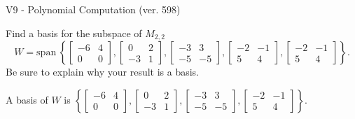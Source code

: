 \begin{exercise}
  \begin{exerciseTitle}V9 - Polynomial Computation (ver. 598)\end{exerciseTitle}
  \begin{exerciseStatement}
    Find a basis for the subspace of \(M_{2,2}\) 
\[W=\mathrm{span}\ \left\{\left[\begin{array}{cc}
-6 & 4 \\
0 & 0
\end{array}\right] , \left[\begin{array}{cc}
0 & 2 \\
-3 & 1
\end{array}\right] , \left[\begin{array}{cc}
-3 & 3 \\
-5 & -5
\end{array}\right] , \left[\begin{array}{cc}
-2 & -1 \\
5 & 4
\end{array}\right] , \left[\begin{array}{cc}
-2 & -1 \\
5 & 4
\end{array}\right]\right\}.\]
 Be sure to explain why your result is a basis.


  \end{exerciseStatement}
  \begin{exerciseAnswer}
   A basis of \(W\) is  \(\left\{\left[\begin{array}{cc}
-6 & 4 \\
0 & 0
\end{array}\right] , \left[\begin{array}{cc}
0 & 2 \\
-3 & 1
\end{array}\right] , \left[\begin{array}{cc}
-3 & 3 \\
-5 & -5
\end{array}\right] , \left[\begin{array}{cc}
-2 & -1 \\
5 & 4
\end{array}\right]\right\}\).
  


  \end{exerciseAnswer}
\end{exercise}